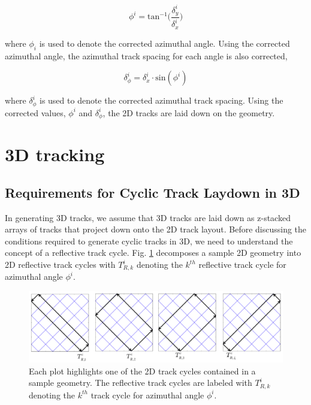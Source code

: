 \begin{equation}
\phi^i = \text{tan}^{-1} \bigg(\frac{\delta_y^i}{\delta_x^i}\bigg)
\label{eqn:azi-correct}
\end{equation}

\noindent
where $\phi_i$ is used to denote the corrected azimuthal angle. Using the corrected azimuthal angle, the azimuthal track spacing for each angle is also corrected,

\begin{equation}
\delta_{\phi}^i = \delta_x^i \cdot \text{sin} (\phi^i)
\label{eqn:azi-space-correct}
\end{equation}

\noindent
where $\delta_{\phi}^i$ is used to denote the corrected azimuthal track spacing. Using the corrected values, $\phi^i$ and $\delta_{\phi}^i$, the 2D tracks are laid down on the geometry. 

\section{3D tracking}

\subsection{Requirements for Cyclic Track Laydown in 3D}

In generating 3D tracks, we assume that 3D tracks are laid down as z-stacked arrays of tracks that project down onto the 2D track layout. Before discussing the conditions required to generate cyclic tracks in 3D, we need to understand the concept of a reflective track cycle. Fig. \ref{figure 2} decomposes a sample 2D geometry into 2D reflective track cycles with $T_{R,k}^{i}$ denoting the $k^{th}$ reflective track cycle for azimuthal angle $\phi^i$. 

\begin{figure}[h]
	\vspace{-0.05in}
	\centering
	\includegraphics[width=6.5in]{figures/mc2015/reflective-track-cycles-3.png}
	\caption{Each plot highlights one of the 2D track cycles contained in a sample geometry. The reflective track cycles are labeled with $T_{R,k}^{i}$ denoting the $k^{th}$ track cycle for azimuthal angle $\phi^i$.}
	\label{figure 2}
\end{figure}

